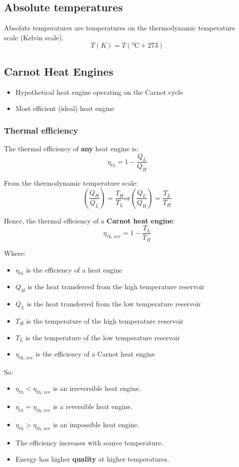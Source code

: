 \documentclass[11pt]{article}
\begin{document}
\subsection{Absolute temperatures}
\label{sec:orgb808e99}
Absolute temperatures are temperatures on the thermodynamic temperature scale (Kelvin scale).
\[T(\unit{K}) = T(\unit{\degreeCelsius} + 273)\]
\subsection{Carnot Heat Engines}
\label{sec:orgd357716}
\begin{itemize}
\item Hypothetical heat engine operating on the Carnot cycle
\item Most efficient (ideal) heat engine
\end{itemize}

 \newpage
\subsubsection{Thermal efficiency}
\label{sec:orga850b2c}
The thermal efficiency of \textbf{any} heat engine is:
\[\eta_{th} = 1 - \frac{Q_L}{Q_H}\]

From the thermodynamic temperature scale:
\[\left(\frac{Q_H}{Q_L}\right) = \frac{T_H}{T_L} \text{or} \left(\frac{Q_L}{Q_H}\right) = \frac{T_L}{T_H}\]

Hence, the thermal efficiency of a \textbf{Carnot heat engine}:
\[\eta_{\text{th, rev}} = 1 - \frac{T_L}{T_H}\]

Where:
\begin{itemize}
\item \(\eta_{th}\) is the efficiency of a heat engine
\item \(Q_H\) is the heat transferred from the high temperature reservoir
\item \(Q_L\) is the heat transferred from the low temperature reservoir
\item \(T_H\) is the temperature of the high temperature reservoir
\item \(T_L\) is the temperature of the low temperature reservoir
\item \(\eta_{\text{th, rev}}\) is the efficiency of a Carnot heat engine
\end{itemize}

So:
\begin{itemize}
\item \(\eta_{th} < \eta_{\text{th, rev}}\) is an irreversible heat engine.
\item \(\eta_{th} = \eta_{\text{th, rev}}\) is a reversible heat engine.
\item \(\eta_{th} > \eta_{\text{th, rev}}\) is an impossible heat engine.
\item The efficiency increases with source temperature.
\item Energy has higher \textbf{quality} at higher temperatures.
\end{itemize}
\end{document}
